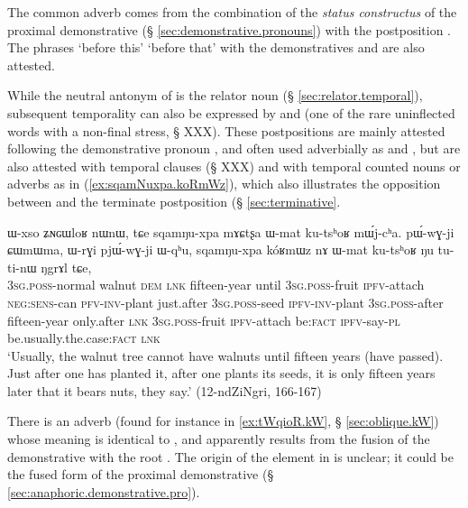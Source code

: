 The common adverb  comes from the combination of the \textit{status constructus} of the proximal demonstrative  (§ \ref{sec:demonstrative.pronouns}) with the postposition . The phrases  `before this'  `before that' with the demonstratives  and   are also attested.

While the neutral antonym of  is the relator noun  (§ \ref{sec:relator.temporal}), subsequent temporality can also be expressed by  and  (one of the rare uninflected words with a non-final stress, § XXX). These postpositions are mainly attested following the demonstrative pronoun , and often used adverbially as  and , but are also attested with temporal clauses (§ XXX) and with temporal counted nouns or adverbs as in (\ref{ex:sqamNuxpa.koRmWz}), which also illustrates the opposition between  and the terminate postposition  (§ \ref{sec:terminative}. 

\begin{exe}
\ex \label{ex:sqamNuxpa.koRmWz}
\gll ɯ-xso ʑɴɢɯloʁ nɯnɯ, tɕe sqamŋu-xpa mɤɕtʂa ɯ-mat ku-tsʰoʁ mɯ́j-cʰa. pɯ́-wɣ-ji ɕɯmɯma, ɯ-rɣi pjɯ́-wɣ-ji ɯ-qʰu,  sqamŋu-xpa kóʁmɯz nɤ ɯ-mat ku-tsʰoʁ ŋu tu-ti-nɯ ŋgrɤl tɕe,  \\
\textsc{3sg}.\textsc{poss}-normal walnut  \textsc{dem} \textsc{lnk} fifteen-year until \textsc{3sg}.\textsc{poss}-fruit \textsc{ipfv}-attach \textsc{neg}:\textsc{sens}-can \textsc{pfv}-\textsc{inv}-plant just.after \textsc{3sg}.\textsc{poss}-seed \textsc{ipfv}-\textsc{inv}-plant \textsc{3sg}.\textsc{poss}-after fifteen-year only.after \textsc{lnk} \textsc{3sg}.\textsc{poss}-fruit \textsc{ipfv}-attach be:\textsc{fact} \textsc{ipfv}-say-\textsc{pl} be.usually.the.case:\textsc{fact} \textsc{lnk} \\
\glt `Usually, the walnut tree cannot have walnuts until fifteen years (have passed). Just after one has planted it, after one plants its seeds, it is only fifteen years later that it bears nuts, they say.' (12-ndZiNgri, 166-167)
\end{exe}

There is an adverb  (found for instance in \ref{ex:tWqioR.kW}, § \ref{sec:oblique.kW}) whose meaning is identical to , and apparently results from the fusion of the demonstrative  with the root . The origin of the  element in  is unclear; it could be the fused form of the proximal demonstrative  (§ \ref{sec:anaphoric.demonstrative.pro}).


